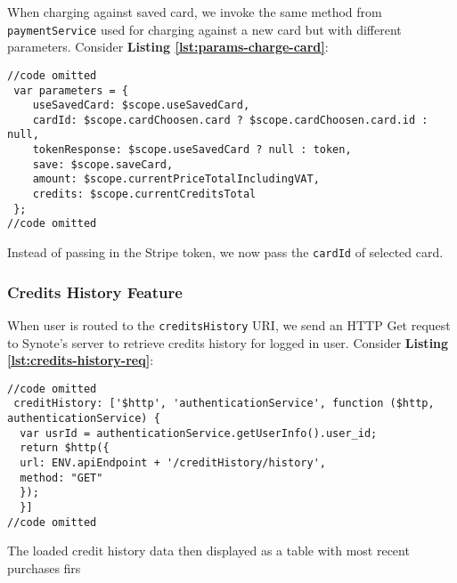 When charging against saved card, we invoke the same method from \texttt{paymentService} used for charging against a new card but with different parameters. Consider \textbf{Listing \ref{lst:params-charge-card}}:\\

\begin{listing}[H]
\begin{verbatim}
//code omitted
 var parameters = {
 	useSavedCard: $scope.useSavedCard,
	cardId: $scope.cardChoosen.card ? $scope.cardChoosen.card.id : null,
	tokenResponse: $scope.useSavedCard ? null : token,
	save: $scope.saveCard,
	amount: $scope.currentPriceTotalIncludingVAT,
	credits: $scope.currentCreditsTotal
 };
//code omitted
\end{verbatim}
\label{lst:params-charge-card}
\end{listing}

Instead of passing in the Stripe token, we now pass the \texttt{cardId} of selected card.\\

\subsubsection{Credits History Feature}
\label{subsubsec:credits-history-feature}

When user is routed to the \texttt{creditsHistory} URI, we send an HTTP Get request to Synote’s server to retrieve credits history for logged in user. Consider \textbf{Listing \ref{lst:credits-history-req}}:\\

\begin{listing}[H]
\begin{verbatim}
//code omitted
 creditHistory: ['$http', 'authenticationService', function ($http, authenticationService) {
  var usrId = authenticationService.getUserInfo().user_id;
  return $http({
  url: ENV.apiEndpoint + '/creditHistory/history',
  method: "GET"
  });
  }]
//code omitted
\end{verbatim}
\label{lst:credits-history-req}
\end{listing}

The loaded credit history data then displayed as a table with most recent purchases firs\\

